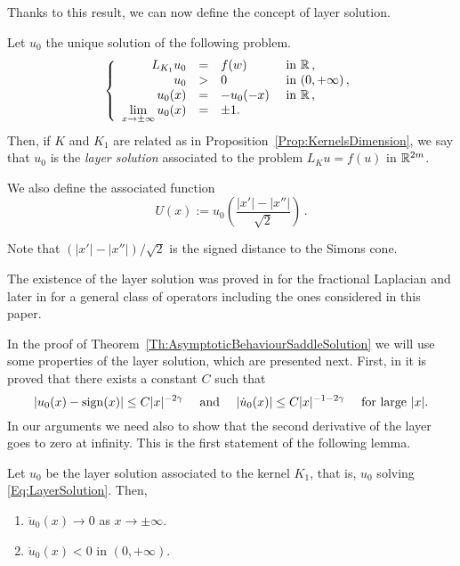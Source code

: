 Thanks to this result, we can now define the concept of layer solution.

\begin{definition}
	Let $u_0$ the unique solution of the following problem.
	\begin{equation}
		\label{Eq:LayerSolution}
			\left\{\begin{array}{rcll}
			L_{K_1}  u_0 &=& f(w) & \textrm{ in }\mathbb{R}\,,\\
			u_0 &>& 0 & \textrm{ in } (0,+\infty)\,,\\
			u_0(x) & = &-u_0(-x)  & \textrm{ in }\mathbb{R}\,,\\
			\displaystyle \lim_{x \to \pm \infty} u_0(x) &=& \pm 1. & 
			\end{array} \right.
	\end{equation}
	Then, if $K$ and $K_1$ are related as in Proposition~\ref{Prop:KernelsDimension}, we say that $u_0$ is the \emph{layer solution} associated to the problem $L_K u = f(u)$ in $\mathbb{R}^{2m}$.
	
	We also define the associated function
	\begin{equation}
		\label{Eq:DefOfU}
		U(x):= u_0 \left( \dfrac{|x'| - |x''|}{\sqrt{2}} \right)\,.
	\end{equation}
\end{definition}
Note that $(|x'| - |x''| )/\sqrt{2}$ is the signed distance to the Simons cone.

The existence of the layer solution was proved in \cite{CabreSolaMorales,CabreSireII} for the fractional Laplacian and later in \cite{CozziPassalacqua} for a general class of operators including the ones considered in this paper. 



In the proof of Theorem~\ref{Th:AsymptoticBehaviourSaddleSolution} we will use some properties of the layer solution, which are presented next. First, in \cite{CozziPassalacqua} it is proved that there exists a constant $C$ such that
\begin{equation}
	\label{Eq:PropertiesLayer}
	|u_0 (x)-\operatorname{sign}(x)| \leq C |x|^{-2\gamma}  \quad \text{ and } \quad |\dot{u}_0 (x)| \leq C |x|^{-1-2\gamma}  \quad \text{ for large }|x|.
\end{equation}
In our arguments we need also to show that the second derivative of the layer goes to zero at infinity. This is the first statement of the following lemma.

\begin{lemma}
	\label{Lemma:SecondDerivativeLayer}
	Let $u_0$ be the layer solution associated to the kernel $K_1$, that is, $u_0$ solving \eqref{Eq:LayerSolution}. Then, 
	\begin{enumerate}[label=(\roman{*})]
		\item $\ddot{u}_0 (x) \to 0$ as $x\to \pm \infty$.	
		\item  $\ddot{u}_0 (x) < 0$ in $(0,+\infty)$.
	\end{enumerate}
\end{lemma}

